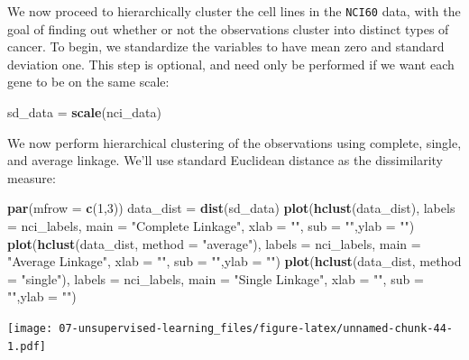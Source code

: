 \documentclass[
  openany]{book}
\newenvironment{Shaded}{\begin{snugshade}}{\end{snugshade}}
\newcommand{\DataTypeTok}[1]{\textcolor[rgb]{0.13,0.29,0.53}{#1}}
\newcommand{\DecValTok}[1]{\textcolor[rgb]{0.00,0.00,0.81}{#1}}
\newcommand{\KeywordTok}[1]{\textcolor[rgb]{0.13,0.29,0.53}{\textbf{#1}}}
\newcommand{\NormalTok}[1]{#1}
\newcommand{\StringTok}[1]{\textcolor[rgb]{0.31,0.60,0.02}{#1}}
\begin{document}
We now proceed to hierarchically cluster the cell lines in the \texttt{NCI60} data,
with the goal of finding out whether or not the observations cluster into
distinct types of cancer. To begin, we standardize the variables to have
mean zero and standard deviation one. This step is
optional, and need only be performed if we want each gene to be on the
same scale:

\begin{Shaded}
\begin{Highlighting}[]
\NormalTok{sd_data =}\StringTok{ }\KeywordTok{scale}\NormalTok{(nci_data)}
\end{Highlighting}
\end{Shaded}

We now perform hierarchical clustering of the observations using complete,
single, and average linkage. We'll use standard Euclidean distance as the dissimilarity
measure:

\begin{Shaded}
\begin{Highlighting}[]
\KeywordTok{par}\NormalTok{(}\DataTypeTok{mfrow =} \KeywordTok{c}\NormalTok{(}\DecValTok{1}\NormalTok{,}\DecValTok{3}\NormalTok{))}
\NormalTok{data_dist =}\StringTok{ }\KeywordTok{dist}\NormalTok{(sd_data)}
\KeywordTok{plot}\NormalTok{(}\KeywordTok{hclust}\NormalTok{(data_dist), }\DataTypeTok{labels =}\NormalTok{ nci_labels, }\DataTypeTok{main =} \StringTok{"Complete Linkage"}\NormalTok{, }\DataTypeTok{xlab =} \StringTok{""}\NormalTok{, }\DataTypeTok{sub =} \StringTok{""}\NormalTok{,}\DataTypeTok{ylab =} \StringTok{""}\NormalTok{)}
\KeywordTok{plot}\NormalTok{(}\KeywordTok{hclust}\NormalTok{(data_dist, }\DataTypeTok{method =} \StringTok{"average"}\NormalTok{), }\DataTypeTok{labels =}\NormalTok{ nci_labels, }\DataTypeTok{main =} \StringTok{"Average Linkage"}\NormalTok{, }\DataTypeTok{xlab =} \StringTok{""}\NormalTok{, }\DataTypeTok{sub =} \StringTok{""}\NormalTok{,}\DataTypeTok{ylab =} \StringTok{""}\NormalTok{)}
\KeywordTok{plot}\NormalTok{(}\KeywordTok{hclust}\NormalTok{(data_dist, }\DataTypeTok{method =} \StringTok{"single"}\NormalTok{), }\DataTypeTok{labels =}\NormalTok{ nci_labels,  }\DataTypeTok{main =} \StringTok{"Single Linkage"}\NormalTok{, }\DataTypeTok{xlab =} \StringTok{""}\NormalTok{, }\DataTypeTok{sub =} \StringTok{""}\NormalTok{,}\DataTypeTok{ylab =} \StringTok{""}\NormalTok{)}
\end{Highlighting}
\end{Shaded}

\texttt{[image: 07-unsupervised-learning\_files/figure-latex/unnamed-chunk-44-1.pdf]}
\end{document}
